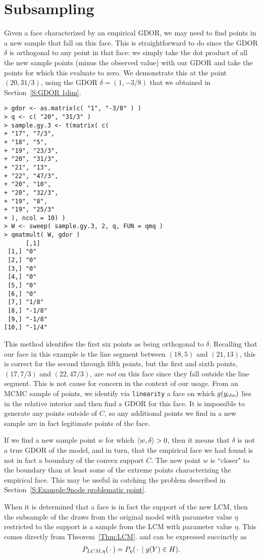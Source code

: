 \section{Subsampling} \label{S:Subsampling}
Given a face characterized by an empirical GDOR, we may need to
find points in a new sample that fall on this face.  This is straightforward to
do since the GDOR $\delta$ is orthogonal to any point in that face:
we simply take the dot product of all the new sample points (minus the
observed value) with our GDOR
and take the points for which this evaluate to zero.
We demonstrate this at the point $(20, 31/3)$, using the GDOR $\delta = (1, -3/8)$
that we obtained in Section~\ref{S:GDOR 1dim}.
{\singlespace
\begin{verbatim}
> gdor <- as.matrix(c( "1", "-3/8" ) )
> q <- c( "20", "31/3" )
> sample.gy.3 <- t(matrix( c(
+ "17", "7/3",
+ "18", "5",
+ "19", "23/3",
+ "20", "31/3",
+ "21", "13",
+ "22", "47/3",
+ "20", "10",
+ "20", "32/3",
+ "19", "8",
+ "19", "25/3"
+ ), ncol = 10) )
> W <- sweep( sample.gy.3, 2, q, FUN = qmq )
> qmatmult( W, gdor )
      [,1]  
 [1,] "0"   
 [2,] "0"   
 [3,] "0"   
 [4,] "0"   
 [5,] "0"   
 [6,] "0"   
 [7,] "1/8" 
 [8,] "-1/8"
 [9,] "-1/8"
[10,] "-1/4"
\end{verbatim}
}
This method identifies the first six points as being orthogonal to $\delta$.
Recalling that our face in this example is the line segment between $(18,5)$ and $(21,13)$,
this is correct for the second through fifth points, but
the first and sixth points, $(17, 7/3)$ and $(22,47/3)$, 
are \emph{not} on this face since they fall outside the line segment.  
This is not cause for concern in the context of our usage.  From an MCMC sample of points,
we identify via \texttt{linearity} a face on which $g(y_{\text{obs}})$ lies in the relative
interior and then find a GDOR for this face.  It is impossible to generate any
points outside of $C$, so any additional points we find in a new sample are in fact legitimate 
points of the face.  

If we find a new sample point $w$ for which $\langle w, \delta \rangle > 0$, then it means that 
$\delta$ is not a true GDOR of the model, and in turn, that the empirical face we had
found is not in fact a boundary of the convex support $C$.  The new point $w$ is ``closer"
to the boundary than at least some of the extreme points characterizing the empirical face.
This may be useful in catching the problem described in 
Section~\ref{S:Example:9node problematic point}.

When it is determined that a face is in fact the support of the new LCM,
then the subsample of the draws from the original model with parameter value $\eta$ 
restricted to the support is a sample from the LCM with 
parameter value $\eta$.  This comes directly from Theorem~\ref{Thm:LCM}.
 and can be expressed succinctly as
\begin{align*}
P_{LCM, \eta}(\,\cdot\,) = P_\eta( \,\cdot\, \mid g(Y) \in H ).
\end{align*}


